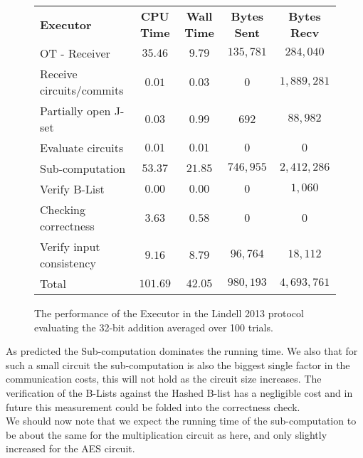 \documentclass[ %
                    author={Nicholas Tutte},
                supervisor={Prof. Nigel Smart},
                    degree={MEng},
                     title={Secure Two Party Computation},
                  subtitle={A practical comparison of recent protocols},
                      type={Research - GG1K},
                      year={2015} ]{dissertation}
\begin{document}
				\begin{figure}[!ht]
					\begin{tabular}{| p{4.3cm} | c c c c |}
						\hline
						\textbf{Executor} & \textbf{CPU Time} & \textbf{Wall Time} & \textbf{Bytes Sent} & \textbf{Bytes Recv} \\
						\thickhline
						OT - Receiver & $35.46$ & $9.79$ & $135,781$ & $284,040$ \\
						\hline
						Receive circuits/commits & $0.01$ & $0.03$ & $0$ & $1,889,281$ \\
						\hline
						Partially open J-set & $0.03$ & $0.99$ & $692$ & $88,982$ \\
						\hline
						Evaluate circuits & $0.01$ & $0.01$ & $0$ & $0$ \\
						\hline
						Sub-computation & $53.37$ & $21.85$ & $746,955$ & $2,412,286$ \\
						\hline
						Verify B-List & $0.00$ & $0.00$ & $0$ & $1,060$ \\
						\hline
						Checking correctness & $3.63$ & $0.58$ & $0$ & $0$ \\
						\hline
						Verify input consistency & $9.16$ & $8.79$ & $96,764$ & $18,112$ \\
						\thickhline
						Total & $101.69$ & $42.05$ & $980,193$ & $4,693,761$ \\
						\hline
					\end{tabular}
					\caption{The performance of the Executor in the Lindell 2013 protocol evaluating the 32-bit addition averaged over 100 trials. \label{table:L_2013_Add_Executor}}
				\end{figure}
				\FloatBarrier

				As predicted the Sub-computation dominates the running time. We also that for such a small circuit the sub-computation is also the biggest single factor in the communication costs, this will not hold as the circuit size increases. The verification of the B-Lists against the Hashed B-list has a negligible cost and in future this measurement could be folded into the correctness check.\\

				We should now note that we expect the running time of the sub-computation to be about the same for the multiplication circuit as here, and only slightly increased for the AES circuit.\\
\end{document}
